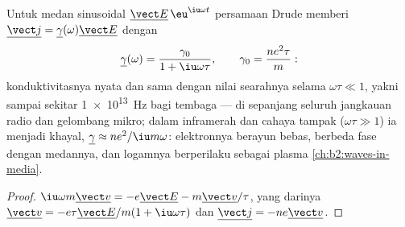 \begin{proposition}\label{prop:b2:charges-currents-conduction:acdrude}
Untuk medan sinusoidal $\underline{\vect E}\,\eu^{\iu\omega t}$ persamaan Drude
memberi $\underline{\vect j} = \underline\gamma(\omega)\underline{\vect E}$ dengan
\[
\underline\gamma(\omega) = \frac{\gamma_0}{1 + \iu\omega\tau} , \qquad \gamma_0 = \frac{ne^2\tau}{m} :
\]
konduktivitasnya nyata dan sama dengan nilai searahnya selama $\omega\tau
\ll 1$, yakni sampai sekitar \qty{1e13}{Hz} bagi tembaga --- di sepanjang seluruh
jangkauan radio dan gelombang mikro; dalam inframerah dan cahaya tampak ($\omega\tau \gg 1$)
ia menjadi khayal, $\underline\gamma \approx ne^2/\iu m\omega$: elektronnya
berayun bebas, berbeda fase dengan medannya, dan logamnya berperilaku
sebagai plasma \cref{ch:b2:waves-in-media}.
\end{proposition}

\begin{proof}
$\iu\omega m\underline{\vect v} = -e\underline{\vect E} - m\underline{\vect v}/\tau$, yang darinya
$\underline{\vect v} = -e\tau\underline{\vect E}/m(1 + \iu\omega\tau)$ dan $\underline{\vect j}
= -ne\underline{\vect v}$.
\end{proof}

